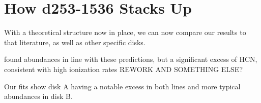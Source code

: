 












\section{How d253-1536 Stacks Up}


With a theoretical structure now in place, we can now compare our results to that literature, as well as other specific disks.











\citet{Factor2017} found \hco abundances in line with these predictions, but a significant excess of HCN, consistent with high ionization rates REWORK AND SOMETHING ELSE?

Our fits show disk A having a notable excess in both lines and more typical abundances in disk B.

